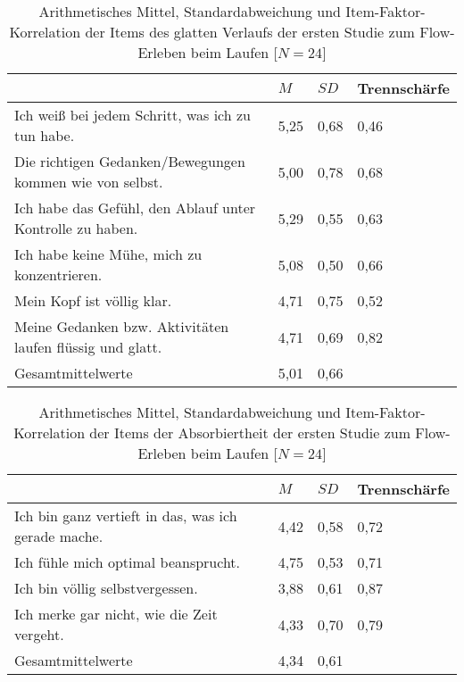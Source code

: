 \begin{table}
	[!htb] \centering \caption[Item-Faktor-Korrelation der Items des glatten Verlaufs (Erste Studie: Laufen)]{Arithmetisches Mittel, Standardabweichung und Item-Faktor-Korrelation der Items des glatten Verlaufs der ersten Studie zum Flow-Erleben beim Laufen [$N = 24$]} \label{tab:glatter_verlauf_1} 
	\begin{tabularx}
		{ 
		\textwidth}{p{} p{} p{} p{}} \toprule & $M$ & $SD$ & Trennschärfe \\
		\midrule Ich weiß bei jedem Schritt, was ich zu tun habe. & 5,25 & 0,68 & 0,46 \\
		Die richtigen Gedanken/Bewegungen kommen wie von selbst. & 5,00 & 0,78 & 0,68 \\
		Ich habe das Gefühl, den Ablauf unter Kontrolle zu haben. & 5,29 & 0,55 & 0,63 \\
		Ich habe keine Mühe, mich zu konzentrieren. & 5,08 & 0,50 & 0,66 \\
		Mein Kopf ist völlig klar. & 4,71 & 0,75 & 0,52 \\
		Meine Gedanken bzw. Aktivitäten laufen flüssig und glatt. & 4,71 & 0,69 & 0,82 \\
		Gesamtmittelwerte & 5,01 & 0,66 & \\
		\bottomrule 
	\end{tabularx}
\end{table}
\begin{table}
	[!htb] \centering \caption[Item-Faktor-Korrelation der Items der Absorbiertheit (Erste Studie: Laufen)]{Arithmetisches Mittel, Standardabweichung und Item-Faktor-Korrelation der Items der Absorbiertheit der ersten Studie zum Flow-Erleben beim Laufen [$N = 24$]} \label{tab:absorbiertheit_1} 
	\begin{tabularx}
		{ 
		\textwidth}{p{} p{} p{} p{}} \toprule & $M$ & $SD$ & Trennschärfe \\
		\midrule Ich bin ganz vertieft in das, was ich gerade mache. & 4,42 & 0,58 & 0,72 \\
		Ich fühle mich optimal beansprucht. & 4,75 & 0,53 & 0,71 \\
		Ich bin völlig selbstvergessen. & 3,88 & 0,61 & 0,87 \\
		Ich merke gar nicht, wie die Zeit vergeht. & 4,33 & 0,70 & 0,79 \\
		Gesamtmittelwerte & 4,34 & 0,61 & \\
		\bottomrule 
	\end{tabularx}
\end{table}


